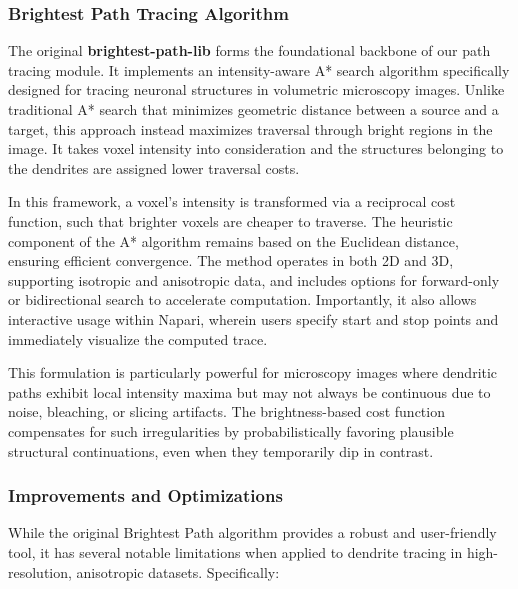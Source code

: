 \subsubsection*{\textbf{Brightest Path Tracing Algorithm}}
The original \textbf{brightest-path-lib} \cite{Jha_2023} forms the foundational backbone of our path tracing module. It implements an intensity-aware A* search algorithm specifically designed for tracing neuronal structures in volumetric microscopy images. Unlike traditional A* search that minimizes geometric distance between a source and a target, this approach instead maximizes traversal through bright regions in the image. It takes voxel intensity into consideration and the structures belonging to the dendrites are assigned lower traversal costs.

In this framework, a voxel’s intensity is transformed via a reciprocal cost function, such that brighter voxels are cheaper to traverse. The heuristic component of the A* algorithm remains based on the Euclidean distance, ensuring efficient convergence. The method operates in both 2D and 3D, supporting isotropic and anisotropic data, and includes options for forward-only or bidirectional search to accelerate computation. Importantly, it also allows interactive usage within Napari, wherein users specify start and stop points and immediately visualize the computed trace.

This formulation is particularly powerful for microscopy images where dendritic paths exhibit local intensity maxima but may not always be continuous due to noise, bleaching, or slicing artifacts. The brightness-based cost function compensates for such irregularities by probabilistically favoring plausible structural continuations, even when they temporarily dip in contrast.

\subsubsection{\textbf{Improvements and Optimizations}}
While the original Brightest Path algorithm provides a robust and user-friendly tool, it has several notable limitations when applied to dendrite tracing in high-resolution, anisotropic datasets. Specifically:

